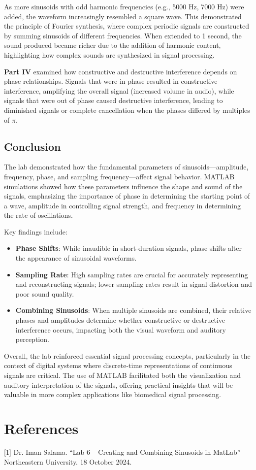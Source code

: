 \documentclass[12pt]{article}
\begin{document}
As more sinusoids with odd harmonic frequencies (e.g., 5000 Hz, 7000 Hz) were 
added, the waveform increasingly resembled a square wave. This demonstrated the 
principle of Fourier synthesis, where complex periodic signals are constructed by 
summing sinusoids of different frequencies. When extended to 1 second, the sound 
produced became richer due to the addition of harmonic content, highlighting how 
complex sounds are synthesized in signal processing.
\newline

\textbf{Part IV} examined how constructive and destructive interference depends on 
phase relationships. Signals that were in phase resulted in constructive interference, 
amplifying the overall signal (increased volume in audio), while signals that were out 
of phase caused destructive interference, leading to diminished signals or complete 
cancellation when the phases differed by multiples of \( \pi \).
\newline

\subsection{Conclusion}

The lab demonstrated how the fundamental parameters of sinusoids—amplitude, 
frequency, phase, and sampling frequency—affect signal behavior. MATLAB 
simulations showed how these parameters influence the shape and sound of the 
signals, emphasizing the importance of phase in determining the starting point 
of a wave, amplitude in controlling signal strength, and frequency in determining 
the rate of oscillations.
\newline

Key findings include:
\begin{itemize}
    \item \textbf{Phase Shifts}: While inaudible in short-duration signals, phase shifts alter the appearance of sinusoidal waveforms.
    \item \textbf{Sampling Rate}: High sampling rates are crucial for accurately representing and reconstructing signals; lower sampling rates result in signal distortion and poor sound quality.
    \item \textbf{Combining Sinusoids}: When multiple sinusoids are combined, their relative phases and amplitudes determine whether constructive or destructive interference occurs, impacting both the visual waveform and auditory perception.
\end{itemize}

Overall, the lab reinforced essential signal processing concepts, particularly in 
the context of digital systems where discrete-time representations of continuous 
signals are critical. The use of MATLAB facilitated both the visualization and 
auditory interpretation of the signals, offering practical insights that will be 
valuable in more complex applications like biomedical signal processing.


\section{References}
 [1] Dr. Iman Salama. “Lab 6 – Creating and Combining Sinusoids in MatLab” Northeastern University. 18 October 2024.
\end{document}
